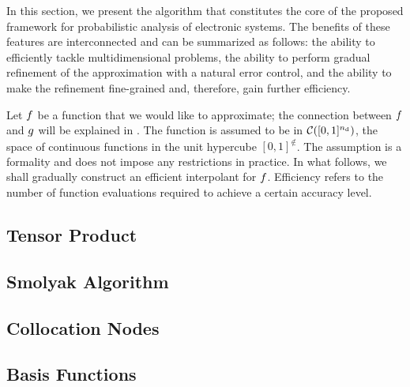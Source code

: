 In this section, we present the algorithm that constitutes the core of the
proposed framework for probabilistic analysis of electronic systems.  The benefits of these features are interconnected and can be
summarized as follows: the ability to efficiently tackle multidimensional
problems, the ability to perform gradual refinement of the approximation with a
natural error control, and the ability to make the refinement fine-grained and,
therefore, gain further efficiency. 

Let $f$ be a function that we would like to approximate; the connection between
$f$ and $g$ will be explained in . The function is assumed to
be in $\mathcal{C}([0, 1]^{n_\text{d}})$, the space of continuous functions in the unit
hypercube $[0, 1]^\nin$. The assumption is a formality and does not impose any
restrictions in practice. In what follows, we shall gradually construct an
efficient interpolant for $f$. Efficiency refers to the number of function
evaluations required to achieve a certain accuracy level.

\subsection{Tensor Product} 


\subsection{Smolyak Algorithm} 



\subsection{Collocation Nodes} 



\subsection{Basis Functions} 


